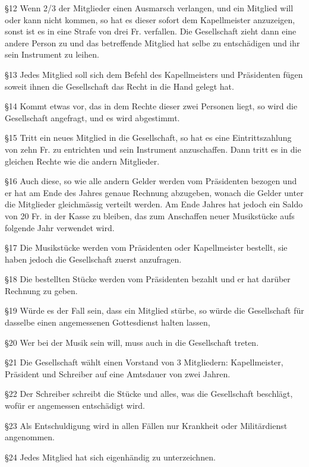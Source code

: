 \begin{history}
    \S12 Wenn 2/3 der Mitglieder einen Ausmarsch verlangen, und ein Mitglied
    will oder kann nicht kommen, so hat es dieser sofort dem Kapellmeister
    anzuzeigen, sonst ist es in eine Strafe von drei Fr. verfallen. Die
    Gesellschaft zieht dann eine andere Person zu und das betreffende Mitglied
    hat selbe zu entschädigen und ihr sein Instrument zu leihen.

    \S13 Jedes Mitglied soll sich dem Befehl des Kapellmeisters und Präsidenten
    fügen soweit ihnen die Gesellschaft das Recht in die Hand gelegt hat.

    \S14 Kommt etwas vor, das in dem Rechte dieser zwei Personen liegt, so wird
    die Gesellschaft angefragt, und es wird abgestimmt.

    \S15 Tritt ein neues Mitglied in die Gesellschaft, so hat es eine
    Eintrittszahlung von zehn Fr. zu entrichten und sein Instrument
    anzuschaffen. Dann tritt es in die gleichen Rechte wie die andern
    Mitglieder.

    \S16 Auch diese, so wie alle andern Gelder werden vom Präsidenten bezogen
    und er hat am Ende des Jahres genaue Rechnung abzugeben, wonach die Gelder
    unter die Mitglieder gleichmässig verteilt werden. Am Ende Jahres hat jedoch
    ein Saldo von 20 Fr. in der Kasse zu bleiben, das zum Anschaffen neuer
    Musikstücke aufs folgende Jahr verwendet wird.

    \S17 Die Musikstücke werden vom Präsidenten oder Kapellmeister bestellt, sie
    haben jedoch die Gesellschaft zuerst anzufragen.

    \S18 Die bestellten Stücke werden vom Präsidenten bezahlt und er hat darüber
    Rechnung zu geben.

    \S19 Würde es der Fall sein, dass ein Mitglied stürbe, so würde die
    Gesellschaft für dasselbe einen angemessenen Gottesdienst halten lassen,

    \S20 Wer bei der Musik sein will, muss auch in die Gesellschaft treten.

    \S21 Die Gesellschaft wählt einen Vorstand von 3 Mitgliedern: Kapellmeister,
    Präsident und Schreiber auf eine Amtsdauer von zwei Jahren.

    \S22 Der Schreiber schreibt die Stücke und alles, was die Gesellschaft
    beschlägt, wofür er angemessen entschädigt wird.

    \S23 Als Entschuldigung wird in allen Fällen nur Krankheit oder
    Militärdienst angenommen.

    \S24 Jedes Mitglied hat sich eigenhändig zu unterzeichnen.\\


\end{history}
